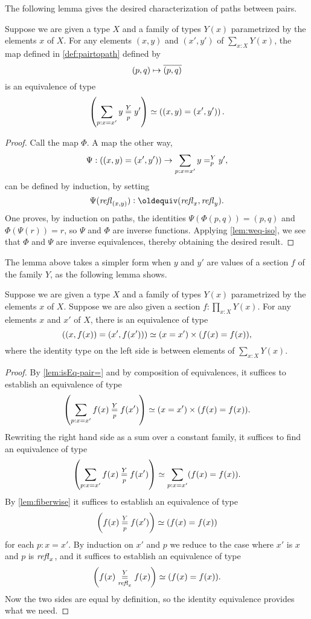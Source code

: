 The following lemma gives the desired characterization of paths between pairs.

\begin{lemma}\label{lem:isEq-pair=}
  Suppose we are given a type $X$ and a family of types $Y(x)$ parametrized by the elements $x$ of $X$.
  For any elements $(x,y)$ and $(x',y')$ of $\sum _{x:X} Y(x)$,
  the map defined in \cref{def:pairtopath} defined by $$(p,q) \mapsto \overline{({p},{q})}$$ is an equivalence of type
  $$\left( \sum_{p:x=x'} {y} \overset{Y}{\underset{p}=} y' \right) \simeq \left ( (x,y) = (x',y') \right ).$$
\end{lemma}

\begin{proof}
  Call the map $\Phi$.
  A map the other way, $$ \Psi : ((x,y) = (x',y')) \to \sum_{p:x=x'} y =^{Y}_{p} y', $$
  can be defined by induction, by setting $$\Psi (\refl {(x,y)}) \defeq (\refl x, \refl y).$$
  One proves, by induction on paths, the identities $ \Psi ( \Phi (p,q) ) = (p,q) $ and $ \Phi (\Psi ( r )) = r$, so $\Psi$ and $\Phi$ are inverse functions.
  Applying \cref{lem:weq-iso}, we see that $\Phi$ and $\Psi$ are inverse equivalences, thereby obtaining the desired result.
\end{proof}

The lemma above takes a simpler form when $y$ and $y'$ are values of a section $f$ of the family $Y$, as the following lemma shows.

\begin{lemma}\label{lem:pathpairsection}
  Suppose we are given a type $X$ and a family of types $Y(x)$ parametrized by the elements $x$ of $X$.
  Suppose we are also given a section $f : \prod_{x:X} Y(x)$.
  For any elements $x$ and $x'$ of $X$,
  there is an equivalence of type
  $$\left ( (x,f(x)) = (x',f(x')) \right ) \simeq (x=x') \times (f(x) = f(x)),$$
  where the identity type on the left side is between elements of $\sum_{x:X} Y(x)$.
\end{lemma}

\begin{proof}
  By \cref{lem:isEq-pair=} and by composition of equivalences, it suffices to establish an equivalence of type
  $$\left( \sum_{p:x=x'} {f(x)} \overset{Y}{\underset{p}=} f(x') \right) \simeq (x=x') \times (f(x) = f(x)).$$
  Rewriting the right hand side as a sum over a constant family, it suffices to find an equivalence of type
  $$\left( \sum_{p:x=x'} {f(x)} \overset{Y}{\underset{p}=} f(x') \right) \simeq \sum_{p:x=x'} (f(x) = f(x)).$$
  By \cref{lem:fiberwise} it suffices to establish an equivalence of type 
  $$ \left( {f(x)} \overset{Y}{\underset{p}=} f(x') \right) \simeq (f(x) = f(x))$$
  for each $p:x=x'$.  By induction on $x'$ and $p$ we reduce to the case where $x'$ is $x$ and $p$ is $\mathop{{\it refl}_{x}}$, and it suffices to establish an
  equivalence of type 
  $$ \left( {f(x)} \overset{Y}{\underset{\mathop{{\it refl}_{x}}}=} f(x) \right) \simeq (f(x) = f(x)).$$
  Now the two sides are equal by definition, so the identity equivalence provides what we need.  
\end{proof}


